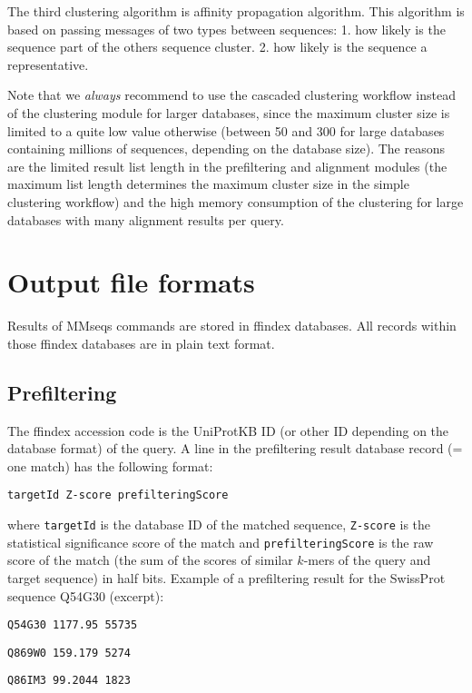 \documentclass[11pt,a4paper]{report}
\begin{document}
The third clustering algorithm is affinity propagation algorithm. This algorithm is based on passing messages of two types between sequences: 1. how likely is the sequence part of the others sequence cluster. 2. how likely is the sequence a representative. 

Note that we \emph{always} recommend to use the cascaded clustering
workflow instead of the clustering module for larger databases, since
the maximum cluster size is limited to a quite low value otherwise
(between 50 and 300 for large databases containing millions of sequences,
depending on the database size). The reasons are the limited result
list length in the prefiltering and alignment modules (the maximum
list length determines the maximum cluster size in the simple clustering
workflow) and the high memory consumption of the clustering for large
databases with many alignment results per query.


\section{Output file formats}

Results of MMseqs commands are stored in ffindex databases. All records
within those ffindex databases are in plain text format. 


\subsection{Prefiltering}

The ffindex accession code is the UniProtKB ID (or other ID depending
on the database format) of the query. A line in the prefiltering result
database record (= one match) has the following format:

\texttt{targetId Z-score prefilteringScore}

where \texttt{targetId} is the database ID of the matched sequence,
\texttt{Z-score} is the statistical significance score of the match
and \texttt{prefilteringScore} is the raw score of the match (the
sum of the scores of similar $k$-mers of the query and target sequence)
in half bits. Example of a prefiltering result for the SwissProt sequence
Q54G30 (excerpt):

\texttt{\footnotesize Q54G30 1177.95 55735}{\footnotesize \par}

\texttt{\footnotesize Q869W0 159.179 5274}{\footnotesize \par}

\texttt{\footnotesize Q86IM3 99.2044 1823}{\footnotesize \par}
\end{document}
